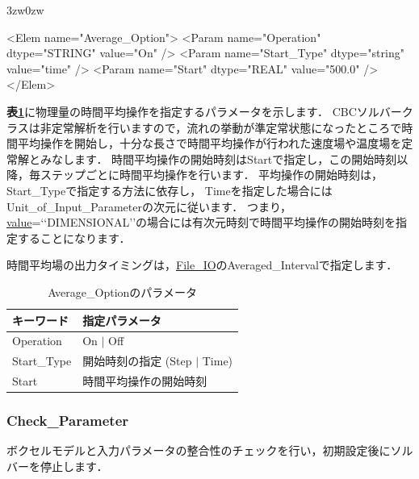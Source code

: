 \begin{indentation}{3zw}{0zw}

{\small
\begin{program}
<Elem name="Average_Option">
  <Param name="Operation"    dtype="STRING" value="On" />
  <Param name="Start_Type"   dtype="string" value="time" />
  <Param name="Start"        dtype="REAL"   value="500.0" />
</Elem>
\end{program}
}

\textbf{表\ref{tbl:averaging}}に物理量の時間平均操作を指定するパラメータを示します．
CBCソルバークラスは非定常解析を行いますので，流れの挙動が準定常状態になったところで時間平均操作を開始し，十分な長さで時間平均操作が行われた速度場や温度場を定常解とみなします．
時間平均操作の開始時刻はStartで指定し，この開始時刻以降，毎ステップごとに時間平均操作を行います．
平均操作の開始時刻は，Start\_Typeで指定する方法に依存し，
Timeを指定した場合にはUnit\_of\_Input\_Parameterの次元に従います．
つまり，\hyperlink{tgt:unit}{value}=\lq\lq DIMENSIONAL\rq\rq の場合には有次元時刻で時間平均操作の開始時刻を指定することになります．

時間平均場の出力タイミングは，\hyperlink{tgt:fileio}{File\_IO}のAveraged\_Intervalで指定します．


\begin{table}[htdp]
\caption{Average\_Optionのパラメータ}
\begin{center}
\small
\begin{tabular}{ll} \toprule
キーワード & 指定パラメータ\\ \midrule
Operation & On $|$ Off\\
Start\_Type & 開始時刻の指定 (Step $|$ Time)\\
Start & 時間平均操作の開始時刻\\ \bottomrule
\end{tabular}
\end{center}
\label{tbl:averaging}
\end{table}

\end{indentation}



\pagebreak
\subsubsection{Check\_Parameter}

ボクセルモデルと入力パラメータの\hypertarget{tgt:check_parameter}{整合性のチェック}を行い，初期設定後にソルバーを停止します．


